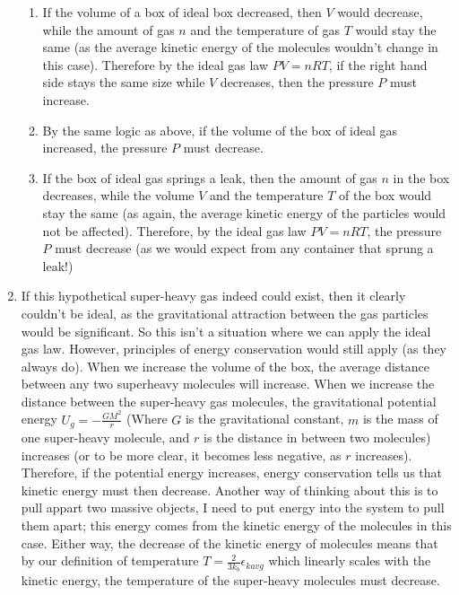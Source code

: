 \begin{enumerate}
\begin{enumerate}
        \item If the volume of a box of ideal box decreased, then $V$ would decrease, while
        the amount of gas $n$ and the temperature of gas $T$ would stay the same (as the average kinetic energy of the molecules wouldn't change in this case). Therefore by the ideal gas law $PV = nRT$, if the right hand side stays the same size while $V$ decreases, then the pressure $P$ must increase.
        \item By the same logic as above, if the volume of the box of ideal gas increased, the pressure $P$ must decrease.
        \item If the box of ideal gas springs a leak, then the amount of gas $n$ in the box decreases, while the volume $V$ and the temperature $T$ of the box would stay the same (as again, the average kinetic energy of the particles would not be affected). Therefore, by the ideal gas law $PV = nRT$, the pressure $P$ must decrease (as we would expect from any container that sprung a leak!)
    \end{enumerate}
    \item If this hypothetical super-heavy gas indeed could exist, then it clearly couldn't be ideal, as the gravitational attraction between the gas particles would be significant. So this isn't a situation where we can apply the ideal gas law. However, principles of energy conservation would still apply (as they always do). When we increase the volume of the box, the average distance between any two superheavy molecules will increase. When we increase the distance between the super-heavy gas molecules, the gravitational potential energy $U_g = -\frac{GM^2}{r}$ (Where $G$ is the gravitational constant, $m$ is the mass of one super-heavy molecule, and $r$ is the distance in between two molecules) increases (or to be more clear, it becomes less negative, as $r$ increases). Therefore, if the potential energy increases, energy conservation tells us that kinetic energy must then decrease. Another way of thinking about this is to pull appart two massive objects, I need to put energy into the system to pull them apart; this energy comes from the kinetic energy of the molecules in this case. Either way, the decrease of the kinetic energy of molecules means that by our definition of temperature $T=\frac{2}{3 k_{b}} \epsilon_{kavg}$ which linearly scales with the kinetic energy, the temperature of the super-heavy molecules must decrease. 

\end{enumerate}
